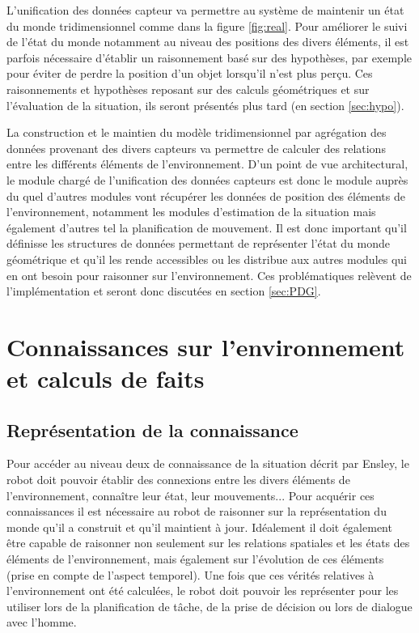 \documentclass[a4paper,11pt,twoside]{StyleThese}
\begin{document}
L'unification des données capteur va permettre au système de maintenir un état du monde tridimensionnel comme dans la figure \ref{fig:real}. Pour améliorer le suivi de l'état du monde notamment au niveau des positions des divers éléments, il est parfois nécessaire d'établir un raisonnement basé sur des hypothèses, par exemple pour éviter de perdre la position d'un objet lorsqu'il n'est plus perçu. Ces raisonnements et hypothèses reposant sur des calculs géométriques et sur l'évaluation de la situation, ils seront présentés plus tard (en section \ref{sec:hypo}). 

La construction et le maintien du modèle tridimensionnel par agrégation des données provenant des divers capteurs va permettre de calculer des relations entre les différents éléments de l'environnement.
D'un point de vue architectural, le module chargé de l'unification des données capteurs est donc le module auprès du quel d'autres modules vont récupérer les données de position des éléments de l'environnement, notamment les modules d'estimation de la situation mais également d'autres tel la planification de mouvement. Il est donc important qu'il définisse les structures de données permettant de représenter l'état du monde géométrique et qu'il les rende accessibles ou les distribue aux autres modules qui en ont besoin pour raisonner sur l'environnement. Ces problématiques relèvent de l'implémentation et seront donc discutées en section \ref{sec:PDG}.


\section{Connaissances sur l'environnement et calculs de faits}
\label{sec:calculs}
\subsection{Représentation de la connaissance}
\label{sec:facts}

Pour accéder au niveau deux de connaissance de la situation décrit par Ensley, le robot doit pouvoir établir des connexions entre les divers éléments de l'environnement, connaître leur état, leur mouvements... Pour acquérir ces connaissances il est nécessaire au robot de raisonner sur la représentation du monde qu'il a construit et qu'il maintient à jour. Idéalement il doit également être capable de raisonner non seulement sur les relations spatiales et les états des éléments de l'environnement, mais également sur l'évolution de ces éléments (prise en compte de l'aspect temporel). Une fois que ces vérités relatives à l'environnement ont été calculées, le robot doit pouvoir les représenter pour les utiliser lors de la planification de tâche, de la prise de décision ou lors de dialogue avec l'homme.
\end{document}

